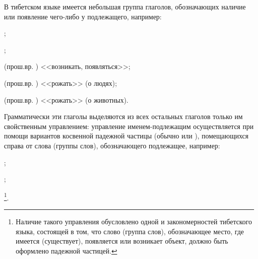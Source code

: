 В тибетском языке имеется небольшая группа глаголов,
обозначающих наличие или появление чего-либо у подлежащего, например:
\begin{prfsample}
	\item {};
	\item {};
	\item {} (прош.вр. ) <<возникать, появляться>>;
	\item {} (прош.вр. ) <<рожать>> (о людях);
	\item {} (прош.вр. ) <<рожать>> (о животных).
\end{prfsample}
Грамматически эти глаголы выделяются из всех остальных глаголов только им свойственным управлением: управление именем-подлежащим осуществляется при помощи вариантов косвенной падежной частицы (обычно  или ), помещающихся справа от слова (группы слов), обозначающего подлежащее, например:
\begin{prfsample}
	\item {};
	\item {};
	\item {}\footnote[34]{Наличие такого управления обусловлено одной и закономерностей тибетского языка, состоящей в том, что слово (группа слов), обозначающее место, где имеется (существует), появляется или возникает объект, должно быть оформлено падежной частицей.}.
\end{prfsample}

